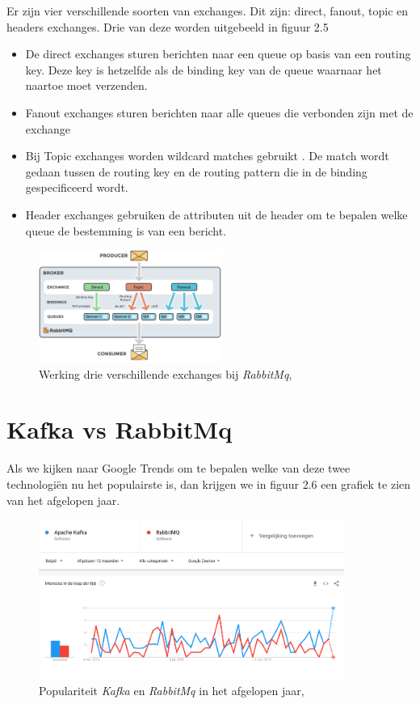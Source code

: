 Er zijn vier verschillende soorten van exchanges. Dit zijn: direct, fanout, topic en headers exchanges. Drie van deze worden uitgebeeld in figuur 2.5 \begin{itemize}
    \item De direct exchanges sturen berichten naar een queue op basis van een routing key. Deze key is hetzelfde als de binding key van de queue waarnaar het naartoe moet verzenden. 
    \item Fanout exchanges sturen berichten naar alle queues die verbonden zijn met de exchange
    \item Bij Topic exchanges worden wildcard matches gebruikt . De match wordt gedaan tussen de routing key en de routing pattern die in de binding gespecificeerd wordt.
    \item Header exchanges gebruiken de attributen uit de header om te bepalen welke queue de bestemming is van een bericht.
\end{itemize}
 \begin{figure}[h!]
    \centering
    \includegraphics[width=60mm]{../rabbitmqExchanges.png}
    \caption{Werking drie verschillende exchanges bij \emph{RabbitMq}, \autocite{Johansson2015}}
    
\end{figure}
\autocite{Johansson2015}
\section{Kafka vs RabbitMq}
Als we kijken naar Google Trends om te bepalen welke van deze twee technologiën nu het populairste is, dan krijgen we in figuur 2.6 een grafiek te zien van het afgelopen jaar.
 \begin{figure}[h!]
    \centering
    \includegraphics[width=100mm]{../KvsRMQ1.png}
    \caption{Populariteit \emph{Kafka} en \emph{RabbitMq} in het afgelopen jaar, \autocite{Trends2019}}
    
\end{figure}


